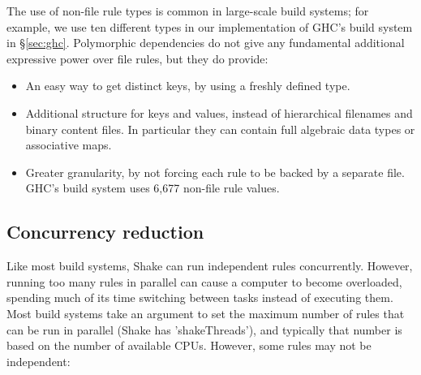 %
%
%
%

The use of non-file rule types is common in large-scale build systems; for
example, we use ten different types in our implementation of GHC's build system
in \S\ref{sec:ghc}. Polymorphic dependencies do not give any fundamental
additional expressive power over file rules, but they do provide:

\begin{itemize}
\item An easy way to get distinct keys, by using a freshly defined type.
\item Additional structure for keys and values, instead of hierarchical
filenames and binary content files. In particular they can contain full
algebraic data types or associative maps.
\item Greater granularity, by not forcing each rule to be backed by a separate
file. GHC's build system uses 6,677 non-file rule values.
\end{itemize}

\subsection{Concurrency reduction\label{sec:concurrency-reduction}}

Like most build systems, Shake can run independent rules concurrently.
However, running too many rules in parallel can cause a computer to become overloaded,
spending much of its time switching between tasks instead of executing them.
Most build systems take an argument to set the maximum number of rules that can
be run in parallel (Shake has \lst'shakeThreads'), and typically that number
is based on the number of available CPUs. However, some rules may not be
independent:

